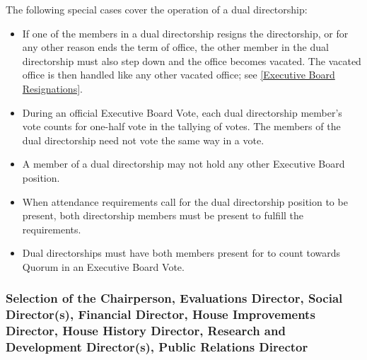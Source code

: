 \documentclass{article}
\newcommand{\asubsection}[1]{\subsubsection{#1} \label{#1}}
\begin{document}
The following special cases cover the operation of a dual directorship:
\begin{itemize}
	\item If one of the members in a dual directorship resigns the directorship, or for any other reason ends the term of office, the other member in the dual directorship must also step down and the office becomes vacated.
		The vacated office is then handled like any other vacated office; see \ref{Executive Board Resignations}.
	\item During an official Executive Board Vote, each dual directorship member's vote counts for one-half vote in the tallying of votes.
		The members of the dual directorship need not vote the same way in a vote.
	\item A member of a dual directorship may not hold any other Executive Board position.
	\item When attendance requirements call for the dual directorship position to be present, both directorship members must be present to fulfill the requirements.
	\item Dual directorships must have both members present for to count towards Quorum in an Executive Board Vote.
\end{itemize}
\asubsection{Selection of the Chairperson, Evaluations Director, Social Director(s), Financial Director, House Improvements Director, House History Director, Research and Development Director(s), Public Relations Director}
\end{document}
